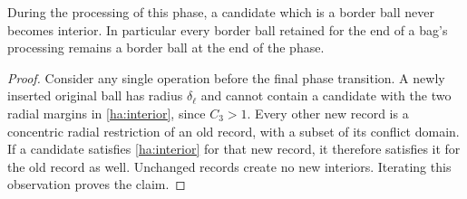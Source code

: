 \begin{lemma}\label{ha:border-monotone}
During the processing of this phase, a candidate which is a border
ball never becomes interior.  In particular every border ball
retained for the end of a bag's processing remains a border ball
at the end of the phase.
\end{lemma}
\begin{proof}
Consider any single operation before the final phase transition.
A newly inserted original ball has radius $\delta_\ell$ and cannot
contain a candidate with the two radial margins in
\eqref{ha:interior}, since $C_3>1$.
Every other new record is a concentric radial restriction of an
old record, with a subset of its conflict domain.  If a candidate
satisfies \eqref{ha:interior} for that new record, it therefore
satisfies it for the old record as well.  Unchanged records create
no new interiors.  Iterating this observation proves the claim.
\end{proof}
